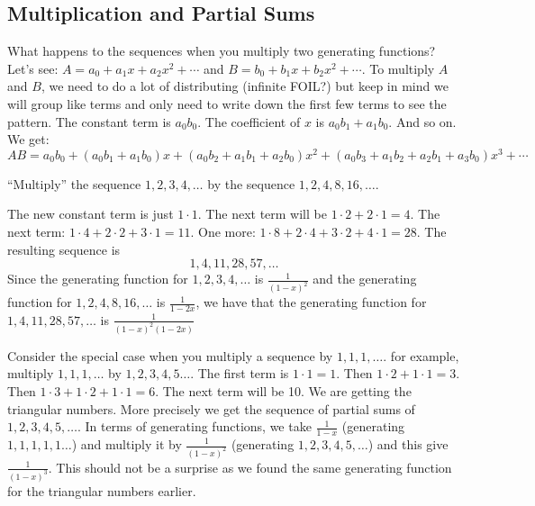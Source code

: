 \documentclass[12pt]{article}
\begin{document}
  

  \subsection{Multiplication and Partial Sums}

What happens to the sequences when you multiply two generating functions?  Let's see: $A = a_0 + a_1x + a_2x^2 + \cdots$ and $B = b_0 + b_1x + b_2x^2 + \cdots$.  To multiply $A$ and $B$, we need to do a lot of distributing (infinite FOIL?) but keep in mind we will group like terms and only need to write down the first few terms to see the pattern.  The constant term is $a_0b_0$.  The coefficient of $x$ is  $a_0b_1 + a_1b_0$.  And so on.  We get:
 \[AB = a_0b_0 + (a_0b_1 + a_1b_0)x + (a_0b_2 + a_1b_1 + a_2b_0)x^2 + (a_0b_3 + a_1b_2 + a_2b_1 + a_3b_0)x^3 + \cdots\]
  
\begin{example}
 ``Multiply'' the sequence $1, 2, 3, 4, \ldots$ by the sequence $1, 2, 4, 8, 16, \ldots$.
 
 \begin{solution}
  The new constant term is just $1 \cdot 1$.  The next term will be $1\cdot 2 + 2 \cdot 1 = 4$.  The next term: $1 \cdot 4 + 2 \cdot 2 + 3 \cdot 1 = 11$.  One more: $1 \cdot 8 + 2 \cdot 4 + 3 \cdot 2 + 4 \cdot 1 = 28$.  The resulting sequence is
  \[1, 4, 11, 28, 57, \ldots\]
  Since the generating function for $1,2,3,4, \ldots$ is $\frac{1}{(1-x)^2}$ and the generating function for $1,2,4,8, 16, \ldots$ is $\frac{1}{1-2x}$, we have that the generating function for $1,4, 11, 28, 57, \ldots$ is $\frac{1}{(1-x)^2(1-2x)}$
 \end{solution}

\end{example}
  
Consider the special case when you multiply a sequence by $1, 1, 1, \ldots$.  for example, multiply $1,1,1,\ldots$ by $1, 2, 3, 4, 5\ldots$.  The first term is $1\cdot 1 = 1$.  Then $1\cdot 2 + 1 \cdot 1 = 3$.  Then $1\cdot 3 + 1\cdot 2 + 1 \cdot 1 = 6$.  The next term will be 10.  We are getting the triangular numbers.  More precisely we get the sequence of partial sums of $1,2,3,4,5, \ldots$.  In terms of generating functions, we take $\frac{1}{1-x}$ (generating $1,1,1,1,1\ldots$) and multiply it by $\frac{1}{(1-x)^2}$ (generating $1,2,3,4,5,\ldots$) and this give $\frac{1}{(1-x)^3}$.  This should not be a surprise as we found the same generating function for the triangular numbers earlier.
  
\end{document}
